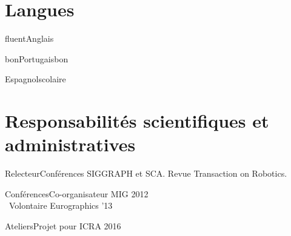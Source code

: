\documentclass{tccv}
\begin{document}

\section{Langues}

\begin{factlist}
\item{fluent}{Anglais}
\item{bon}{Portugais}{bon}
\item{Espagnol}{scolaire}%
\end{factlist}


\section{Responsabilit\'es scientifiques et administratives}
\begin{factlist}
\item{Relecteur}{Conf\'erences SIGGRAPH et SCA. Revue Transaction on Robotics.}
\item{Conf\'erences}{Co-organisateur  MIG 2012 \\ Volontaire Eurographics '13}
\item{Ateliers}{Projet pour ICRA 2016} \\ \\
\end{factlist}
\end{document}
